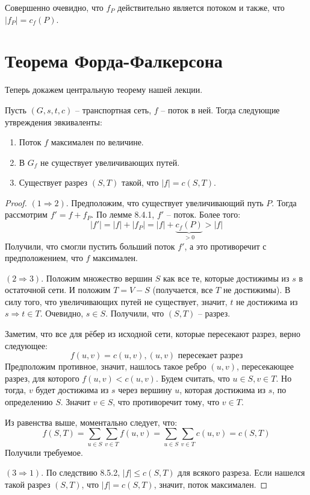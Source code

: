 Совершенно очевидно, что $f_P$ действительно является потоком и также, что $|f_P| = c_f(P)$.

\section{Теорема Форда-Фалкерсона}

Теперь докажем центральную теорему нашей лекции.

 Пусть $(G, s, t, c)$ -- транспортная сеть, $f$ -- поток в ней. Тогда следующие утвреждения эвкиваленты:
\begin{enumerate}
    \item Поток $f$ максимален по величине.
    \item В $G_f$ не существует увеличивающих путей.
    \item Существует разрез $(S, T)$ такой, что $|f| = c(S, T)$.
\end{enumerate}
\begin{proof}

    $(1 \Rightarrow 2).$ Предположим, что существует увеличивающий путь $P$. Тогда рассмотрим $f' = f + f_P$. По лемме 8.4.1, $f'$ -- поток. Более того:
    \begin{equation*}
        |f'| = |f| + |f_P| = |f| + \underbrace{c_f(P)}_{>0} > |f|
    \end{equation*}
    Получили, что смогли пустить больший поток $f'$, а это противоречит с предположением, что $f$ максимален.

    $(2 \Rightarrow 3).$ Положим множество вершин $S$ как все те, которые достижимы из $s$ в остаточной сети. И положим $T = V - S$ (получается, все $T$ не достижимы).
    В силу того, что увеличивающих путей не существует, значит, $t$ не достижима из $s \Rightarrow t \in T$. Очевидно, $s \in S$. Получили, что $(S, T)$ -- разрез.

    Заметим, что все для рёбер из исходной сети, которые пересекают разрез, верно следующее:
    \begin{equation*}
        f(u, v) = c(u, v), \text{$(u, v)$ пересекает разрез}
    \end{equation*}
    Предположим противное, значит, нашлось такое ребро $(u, v)$, пересекающее разрез, для которого $f(u, v) < c(u, v)$. Будем считать, что $u \in S, v \in T$.
    Но тогда, $v$ будет достижима из $s$ через вершину $u$, которая достижима из $s$, по определению $S$. Значит $v \in S$, что противоречит тому, что $v \in T$.

    Из равенства выше, моментально следует, что:
    \begin{equation*}
        f(S, T) = \sum\limits_{u \in S} \sum\limits_{v \in T} f(u, v) = \sum\limits_{u \in S} \sum\limits_{v \in T} c(u, v) = c(S, T)
    \end{equation*}
    Получили требуемое.

    $(3 \Rightarrow 1).$ По следствию 8.5.2, $|f| \leq c(S, T)$ для всякого разреза. Если нашелся такой разрез $(S, T)$, что $|f| = c(S, T)$, значит, поток максимален. 

\end{proof}

